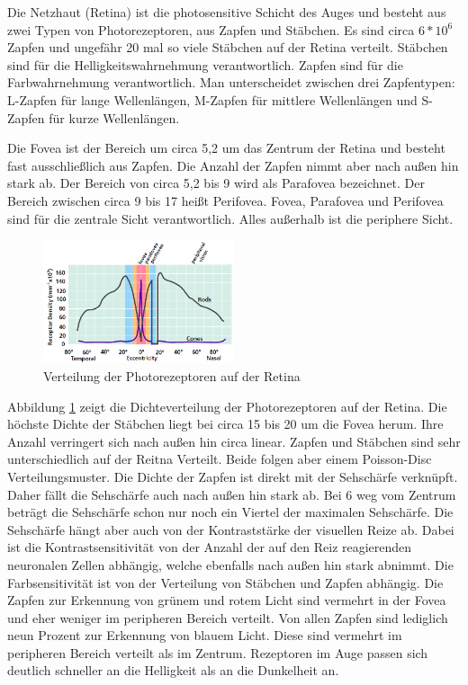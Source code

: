 Die Netzhaut (Retina) ist die photosensitive Schicht des Auges und besteht aus zwei Typen von Photorezeptoren, aus Zapfen und Stäbchen.
Es sind circa $6*10^6$ Zapfen und ungefähr 20 mal so viele Stäbchen auf der Retina verteilt.
Stäbchen sind für die Helligkeitswahrnehmung verantwortlich.
Zapfen sind für die Farbwahrnehmung verantwortlich.
Man unterscheidet zwischen drei Zapfentypen: L-Zapfen für lange Wellenlängen, M-Zapfen für mittlere Wellenlängen und S-Zapfen für kurze Wellenlängen.

Die Fovea ist der Bereich um circa 5,2\textdegree{} um das Zentrum der Retina und besteht fast ausschließlich aus Zapfen.
Die Anzahl der Zapfen nimmt aber nach außen hin stark ab.
Der Bereich von circa 5,2\textdegree{} bis 9\textdegree{} wird als Parafovea bezeichnet.
Der Bereich zwischen circa 9\textdegree{} bis 17\textdegree{} heißt Perifovea.
Fovea, Parafovea und Perifovea sind für die zentrale Sicht verantwortlich.
Alles außerhalb ist die periphere Sicht.

\begin{figure}
	\centering
	\includegraphics[width=0.5\textwidth]{../../Grafiken/Retinal-photoreceptor-distr_from-star-report.PNG}
	\caption{Verteilung der Photorezeptoren auf der Retina \cite{doi:10.1111/cfg.13150}}
	\label{fig:eye02}
\end{figure}

Abbildung \ref{fig:eye02} zeigt die Dichteverteilung der Photorezeptoren auf der Retina.
Die höchste Dichte der Stäbchen liegt bei circa 15\textdegree{} bis 20\textdegree{} um die Fovea herum.
Ihre Anzahl verringert sich nach außen hin circa linear.
Zapfen und Stäbchen sind sehr unterschiedlich auf der Reitna Verteilt.
Beide folgen aber einem Poisson-Disc Verteilungsmuster.
Die Dichte der Zapfen ist direkt mit der Sehschärfe verknüpft.
Daher fällt die Sehschärfe auch nach außen hin stark ab.
Bei 6\textdegree{} weg vom Zentrum beträgt die Sehschärfe schon nur noch ein Viertel der maximalen Sehschärfe.
Die Sehschärfe hängt aber auch von der Kontraststärke der visuellen Reize ab.
Dabei ist die Kontrastsensitivität von der Anzahl der auf den Reiz reagierenden neuronalen Zellen abhängig, welche ebenfalls nach außen hin stark abnimmt.
Die Farbsensitivität ist von der Verteilung von Stäbchen und Zapfen abhängig.
Die Zapfen zur Erkennung von grünem und rotem Licht sind vermehrt in der Fovea und eher weniger im peripheren Bereich verteilt.
Von allen Zapfen sind lediglich neun Prozent zur Erkennung von blauem Licht.
Diese sind vermehrt im peripheren Bereich verteilt als im Zentrum.
Rezeptoren im Auge passen sich deutlich schneller an die Helligkeit als an die Dunkelheit an.

